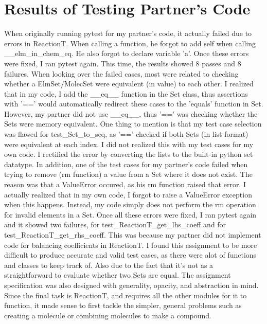 \documentclass[12pt]{article}
\begin{document}
\section{Results of Testing Partner's Code}
When originally running pytest for my partner's code, it actually failed due to errors in ReactionT. When calling a function, he forgot to add self when calling \_\_elm\_in\_chem\_eq. He also forgot to declare variable 'a'.
\newline 
Once these errors were fixed, I ran pytest again. This time, the results showed 8 passes and 8 failures. When looking over the failed cases, most were related to checking whether a ElmSet/MolecSet were equivalent (in value) to each other. I realized that in my code, I add the \_\_eq\_\_ function in the Set class, thus assertions with '==' would automatically redirect these cases to the 'equals' function in Set. However, my partner did not use \_\_eq\_\_, thus '==' was checking whether the Sets were memory equivalent. \newline 
One thing to mention is that my test case selection was flawed for test\_Set\_to\_seq, as '==' checked if both Sets (in list format) were equivalent at each index. I did not realized this with my test cases for my own code. I rectified the error by converting the lists to the built-in python set datatype. \newline
In addition, one of the test cases for my partner's code failed when trying to remove (rm function) a value from a Set where it does not exist. The reason was that a ValueError occured, as his rm function raised that error. I actually realized that in my own code, I forgot to raise a ValueError exception when this happens. Instead, my code simply does not perform the rm operation for invalid elements in a Set. \newline
Once all these errors were fixed, I ran pytest again and it showed two failures, for test\_ReactionT\_get\_lhs\_coeff and for test\_ReactionT\_get\_rhs\_coeff. This was because my partner did not implement code for balancing coefficients in ReactionT. \newline \newline
I found this assignment to be more difficult to produce accurate and valid test cases, as there were alot of functions and classes to keep track of. Also due to the fact that it's not as a straightforward to evaluate whether two Sets are equal. 
\newline
The assignment specification was also designed with generality, opacity, and abstraction in mind. Since the final task is ReactionT, and requires all the other modules for it to function, it made sense to first tackle the simpler, general problems such as creating a molecule or combining molecules to make a compound.
\end{document}
